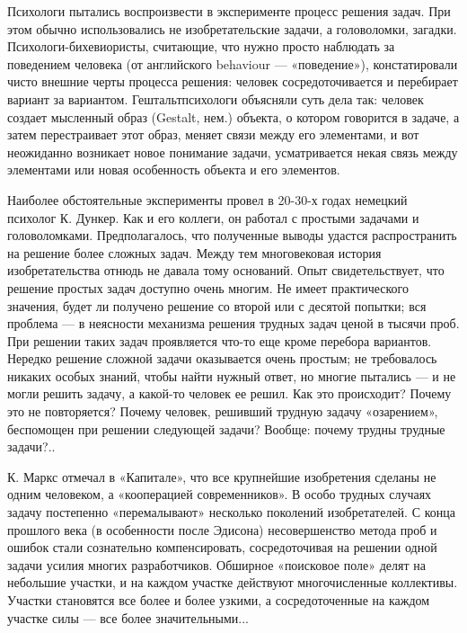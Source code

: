 Психологи  пытались  воспроизвести   в  эксперименте  процесс  решения
задач. При  этом обычно  использовались не изобретательские  задачи, а
головоломки,  загадки.  Психологи-бихевиористы, считающие,  что  нужно
просто наблюдать  за поведением  человека (от английского  behaviour —
«поведение»),  констатировали чисто  внешние  черты процесса  решения:
человек   сосредоточивается  и   перебирает   вариант  за   вариантом.
Гештальтпсихологи объясняли  суть дела так: человек  создает мысленный
образ (Gestalt, нем.)  объекта, о котором говорится в  задаче, а затем
перестраивает этот  образ, меняет  связи между  его элементами,  и вот
неожиданно возникает новое понимание задачи, усматривается некая связь
между элементами или новая особенность объекта и его элементов.

Наиболее обстоятельные  эксперименты провел  в 20-30-х  годах немецкий
психолог  К.  Дункер.  Как  и  его  коллеги,  он  работал  с  простыми
задачами  и  головоломками.   Предполагалось,  что  полученные  выводы
удастся  распространить  на решение  более  сложных  задач. Между  тем
многовековая история изобретательства отнюдь не давала тому оснований.
Опыт свидетельствует, что решение простых задач доступно очень многим.
Не имеет практического  значения, будет ли получено  решение со второй
или с  десятой попытки; вся  проблема — в неясности  механизма решения
трудных задач ценой в тысячи проб. При решении таких задач проявляется
что-то еще  кроме перебора  вариантов. Нередко решение  сложной задачи
оказывается очень простым; не требовалось никаких особых знаний, чтобы
найти нужный  ответ, но многие  пытались —  и не могли  решить задачу,
а  какой-то  человек ее  решил.  Как  это  происходит? Почему  это  не
повторяется?  Почему  человек,  решивший трудную  задачу  «озарением»,
беспомощен при решении следующей задачи? Вообще: почему трудны трудные
задачи?..

К.  Маркс  отмечал  в   «Капитале»,  что  все  крупнейшие  изобретения
сделаны  не одним  человеком, а  «кооперацией современников».  В особо
трудных случаях  задачу постепенно «перемалывают»  несколько поколений
изобретателей.  С конца  прошлого века  (в особенности  после Эдисона)
несовершенство метода проб и  ошибок стали сознательно компенсировать,
сосредоточивая на  решении одной  задачи усилия  многих разработчиков.
Обширное  «поисковое поле»  делят на  небольшие участки,  и на  каждом
участке  действуют многочисленные  коллективы. Участки  становятся все
более и более  узкими, а сосредоточенные на каждом участке  силы — все
более значительными...

